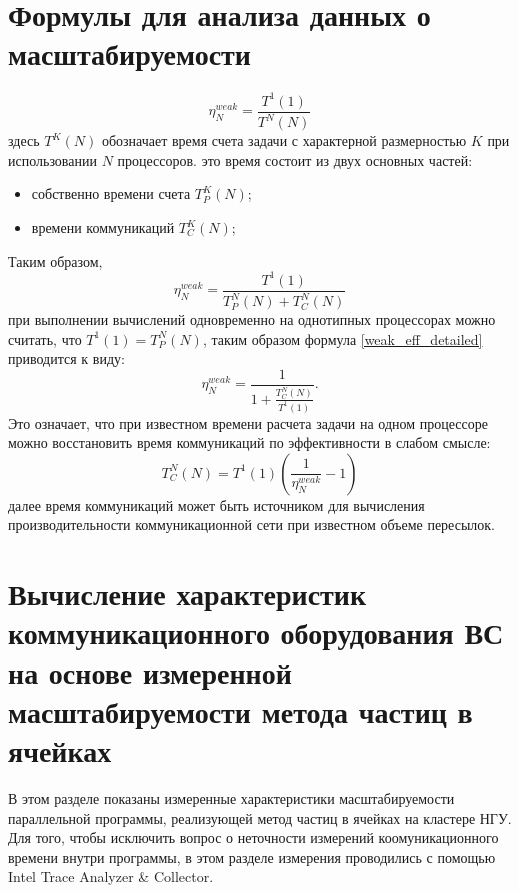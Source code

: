 		\section{Формулы для анализа данных о масштабируемости}
		
			\begin{equation}
			\label{weak_eff}
			\eta^{weak}_N = \frac{T^1(1)}{T^N(N)}
			\end{equation}
			здесь $T^K(N)$ обозначает время счета задачи с характерной размерностью $K$ при использовании $N$ процессоров.
			это время состоит из двух основных частей:
			\begin{itemize}
				\item собственно времени счета $T^K_{P}(N)$;
				\item времени коммуникаций $T^K_C(N)$;
			\end{itemize}
			Таким образом,
			\begin{equation}
			\label{weak_eff_detailed}
			\eta^{weak}_N = \frac{T^1(1)}{T^N_{P}(N)+T^N_C(N)}
			\end{equation}
			при выполнении вычислений одновременно на однотипных процессорах
			можно считать, что $T^1(1) = T^N_{P}(N)$, таким образом формула
			\ref{weak_eff_detailed} приводится к виду:
			\begin{equation}
			\label{weak_eff_detailed-time}
			\eta^{weak}_N = \frac{1}{1+ \frac{T^N_{C}(N)}{T^1(1)}}.
			\end{equation}
			Это означает, что при известном времени расчета задачи на одном процессоре можно восстановить время коммуникаций по эффективности в слабом смысле:
			\begin{equation}
			\label{comm_time_from_efficiency}
			T^N_{C}(N) = T^1(1) \left(\frac{1}{\eta^{weak}_N} - 1\right)
			\end{equation}
			далее время коммуникаций может быть источником для вычисления производительности коммуникационной сети при известном объеме пересылок.
			
			
			
		
		
		
	
	    \section{Вычисление характеристик коммуникационного оборудования ВС на основе измеренной масштабируемости метода частиц в ячейках}
	    
	    
	    
	    В этом разделе показаны измеренные характеристики масштабируемости параллельной программы, реализующей метод частиц в ячейках на кластере НГУ. Для того, чтобы исключить вопрос о неточности измерений коомуникационного времени внутри программы, в этом разделе измерения проводились с помощью Intel Trace Analyzer \& Collector.
	    
